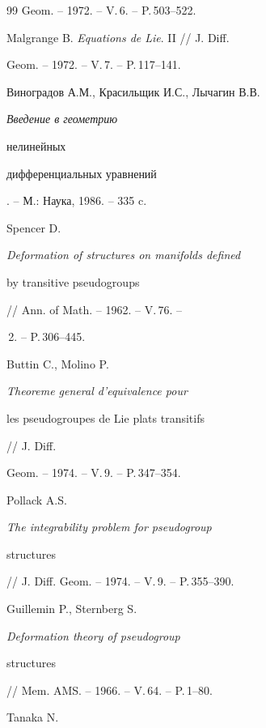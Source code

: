 \begin{thebibliography}{99}
Geom. -- 1972. -- V.\,6. -- P.\,503--522.







Malgrange B. {\it Equations de Lie}. II // J. Diff.


Geom. -- 1972. -- V.\,7. -- P.\,117--141.










Виноградов А.М., Красильщик И.С., Лычагин В.В. {\em Введение в геометрию


нелинейных


дифференциальных уравнений}. -- М.: Наука, 1986. -- 335 c.







Spencer D. {\it Deformation of structures on manifolds defined


by transitive pseudogroups} // Ann. of Math. -- 1962. -- V.\,76. --


\No\,2. -- P.\,306--445.







Buttin C., Molino P. {\it Theoreme general d'equivalence pour


les pseudogroupes de Lie plats transitifs} // J. Diff.


Geom. -- 1974. -- V.\,9. -- P.\,347--354.







Pollack A.S. {\it The integrability problem for pseudogroup


structures} // J. Diff. Geom. -- 1974. -- V.\,9. -- P.\,355--390.







Guillemin P., Sternberg S. {\it Deformation theory of pseudogroup


structures} // Mem. AMS. -- 1966. -- V.\,64. -- P.\,1--80.







Tanaka N.



\end{thebibliography}
